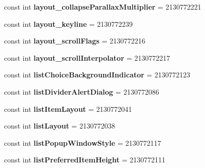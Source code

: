 \begin{DoxyCompactItemize}
const int {\bfseries layout\+\_\+collapse\+Parallax\+Multiplier} = 2130772221
\item 
\mbox{\label{classXaria_1_1Resource_1_1Attribute_a7b578fc055d3e08855d0cac14d76928f}} 
const int {\bfseries layout\+\_\+keyline} = 2130772239
\item 
\mbox{\label{classXaria_1_1Resource_1_1Attribute_afad020bba3ce2452bb573725df609a0e}} 
const int {\bfseries layout\+\_\+scroll\+Flags} = 2130772216
\item 
\mbox{\label{classXaria_1_1Resource_1_1Attribute_abf07c543957b168c89c6db5e2731a71c}} 
const int {\bfseries layout\+\_\+scroll\+Interpolator} = 2130772217
\item 
\mbox{\label{classXaria_1_1Resource_1_1Attribute_a07da27fdb7ba141dd9ea2dc50aa4ccbf}} 
const int {\bfseries list\+Choice\+Background\+Indicator} = 2130772123
\item 
\mbox{\label{classXaria_1_1Resource_1_1Attribute_aef96a4079482495428839029ebe9bb48}} 
const int {\bfseries list\+Divider\+Alert\+Dialog} = 2130772086
\item 
\mbox{\label{classXaria_1_1Resource_1_1Attribute_a10790168ff42cc057e50cbe3bade4f85}} 
const int {\bfseries list\+Item\+Layout} = 2130772041
\item 
\mbox{\label{classXaria_1_1Resource_1_1Attribute_a9b98fd8cc8c6c4319f9fe1e946bca205}} 
const int {\bfseries list\+Layout} = 2130772038
\item 
\mbox{\label{classXaria_1_1Resource_1_1Attribute_aba48aba2e153b05775e24e996bf91719}} 
const int {\bfseries list\+Popup\+Window\+Style} = 2130772117
\item 
\mbox{\label{classXaria_1_1Resource_1_1Attribute_aa98ce6c8ea4ee3f63c7d9c28fddfaa89}} 
const int {\bfseries list\+Preferred\+Item\+Height} = 2130772111
\item 

\end{DoxyCompactItemize}
